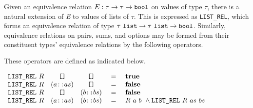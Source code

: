 \documentclass[envcountsame,runningheads]{llncs}
\begin{document}
Given an equivalence relation
$E:\tau \rightarrow \tau \rightarrow \mbox{\tt bool}$
on values of type $\tau$,
there is a natural extension of {\it E\/} to values of lists of $\tau$.
This is expressed as {\tt LIST\_REL},
which forms an equivalence relation of type
$\tau\ \mbox{\tt list} \rightarrow \tau\ \mbox{\tt list} \rightarrow \mbox{\tt bool}$.
Similarly, equivalence relations on pairs, sums, and options
may be formed
from their constituent types' equivalence relations by the following operators.

\begin{center}
\end{center}

These operators are defined
as indicated below.

\begin{definition}
\label{listrel}
$\begin{array}[t]{lcccl}
\mbox{\tt LIST\_REL}\ R & \mbox{\tt []} & \mbox{\tt []} & \ = \  & \mbox{\bf true} \\
\mbox{\tt LIST\_REL}\ R & (a \mbox{\tt ::} as) & \mbox{\tt []} & \ = \ & \mbox{\bf false}\\
\mbox{\tt LIST\_REL}\ R & \mbox{\tt []} & (b \mbox{\tt ::} bs) & \ = \  & \mbox{\bf false}\\
\mbox{\tt LIST\_REL}\ R & (a \mbox{\tt ::} as) & (b \mbox{\tt ::} bs) & \ = \ 
   & R\ a\ b\ \wedge \mbox{\tt LIST\_REL}\ R\ as\ bs
\end{array}$
\end{definition}
\end{document}
